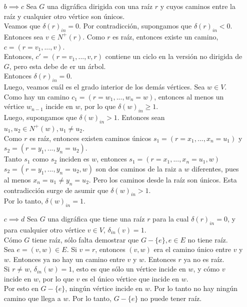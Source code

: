 \documentclass[12pt,a4paper]{report}
\begin{document}
\begin{enumerate}
{\begin{itemize}
				\item[$b \implies c$]{
					Sea $G$ una digráfica dirigida con una raíz $r$ y cuyos caminos entre la raíz y
					cualquier otro vértice son únicos.\\
					Veamos que $\delta(r)_{in} = 0$. Por contradicción, supongamos que
					$\delta(r)_{in} < 0$. Entonces sea $v \in N^+(r)$. Como $r$ es raíz,
					entonces existe un camino, $c = (r = v_1, ..., v)$. \\
					Entonces, $c' = (r = v_1, ..., v, r)$ contiene un ciclo en la versión no
					dirigida de $G$, pero esta debe de er un árbol.\\
					Entonces $\delta(r)_{in} = 0$.\\
					Luego, veamos cuál es el grado interior de los demás vértices.
					Sea $w \in V$. Como hay un camino $c_1 = (r = w_1, ..., w_n = w)$,
					entonces al menos un vértice $w_{n-1}$ incide en $w$, por lo que
					$\delta(w)_{in} \geq 1$.\\
					Luego, supongamos que $\delta(w)_{in} > 1$. Entonces sean
					 $u_1, u_2 \in N^+(w), u_1 \neq u_2$.\\
					Como $r$ es raíz, entonces existen caminos únicos $s_1 = (r = x_1, ..., x_n = u_1)$
					y $s_2 = (r = y_1, ..., y_n = u_2)$.\\
					Tanto $s_1$ como  $s_2$ inciden es $w$, entonces
					$s_1 = (r = x_1, ..., x_n = u_1, w)$ $s_2 = (r = y_1, ..., y_n = u_2, w)$
					son dos caminos de la raiz a $w$ diferentes, pues al menos $x_n = u_1 \neq y_n = u_2$.
					Pero los caminos desde la raíz son únicos. Esta contradicción surge de
					asumir que $\delta(w)_{in} > 1$.\\
					Por lo tanto, $\delta(w)_{in} = 1$.\\
				}


				\item[$c \implies d$]{
					Sea $G$ una digráfica que tiene una raíz $r$ para la cual $\delta(r)_{in} = 0$,
					y para cualquier otro vértice  $v \in V$, $\delta_{in}(v) = 1$.\\
					Cómo $G$ tiene raíz, sólo falta demostrar que $G-\{e\}, e \in E$ no tiene
					raíz.\\
					Sea $e = (v, w) \in E$. Si $v = r$, entonces $(v, w)$ era el camino único
					entre $v$ y $w$. Entonces ya no hay un camino entre $v$ y $w$. Entonces
					$r$ ya no es raíz.\\
					Si $r \neq w$, $\delta_{in}(w) = 1$, esto es que sólo un vértice
					incide en $w$, y cómo $v$ incide en $w$, por lo que $v$ es el único vértice
					que incide en $w$.\\
					Por esto en $G-\{e\}$, ningún vértice incide en $w$. Por lo tanto
					no hay ningún camino que llega a $w$.
					Por lo tanto, $G-\{e\}$ no puede tener raíz.\\
				}


\end{itemize}}
\end{enumerate}
\end{document}
